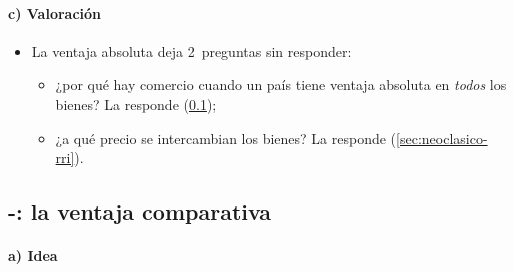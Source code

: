 \documentclass[11pt]{article}
\begin{document}
\paragraph{c) Valoración}

\begin{itemize}
\item La ventaja absoluta deja 2~preguntas sin responder:
  \begin{itemize}
  \item ¿por qué hay comercio cuando un país tiene ventaja absoluta en \emph{todos} los bienes? La responde  (\ref{sec:ricardo});
  \item ¿a qué precio se intercambian los bienes? La responde  (\ref{sec:neoclasico-rri}).
  \end{itemize}
\end{itemize}

\subsection{-: la ventaja comparativa}\label{sec:ricardo}

\paragraph{a) Idea}
\end{document}
